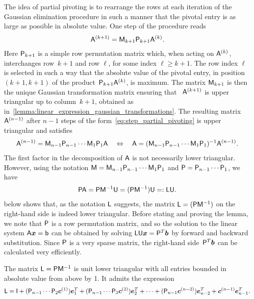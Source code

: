 The idea of partial pivoting is to rearrange the rows at each iteration of the Gaussian elimination procedure in such a manner that
the pivotal entry is as large as possible in absolute value.
One step of the procedure reads
\begin{equation}
    \label{eq:step_partial_pivoting}
    \mathsf A^{(k+1)} = \mathsf M_{k+1} \mathsf P_{k+1} \mathsf A^{(k)}.
\end{equation}
Here $\mathsf P_{k+1}$ is a simple row permutation matrix which,
when acting on $\mathsf A^{(k)}$,
interchanges row~$k+1$ and row $\ell$,
for some index $\ell \geq k+1$.
The row index $\ell$ is selected in such a way that the absolute value of the pivotal entry,
in position $(k+1, k+1)$ of the product~$\mathsf P_{k+1} \mathsf A^{(k)}$, is maximum.
The matrix $\mathsf M_{k+1}$ is then the unique Gaussian transformation matrix ensuring that~%
$\mathsf A^{(k+1)}$ is upper triangular up to column~$k+1$,
obtained as in~\cref{lemma:linear_expression_gaussian_transformations}.
The resulting matrix $\mathsf A^{(n-1)}$ after $n-1$ steps of the form~\eqref{eq:step_partial_pivoting} is upper triangular and satisfies
\[
    \mathsf A^{(n-1)} = \mathsf M_{n-1} \mathsf P_{n-1} \dotsb \mathsf M_{1} \mathsf P_{1} \mathsf A
    \quad \Leftrightarrow \quad
     \mathsf A = (\mathsf M_{n-1} \mathsf P_{n-1} \dotsb \mathsf M_{1} \mathsf P_{1})^{-1} \mathsf A^{(n-1)}.
\]
The first factor in the decomposition of $\mathsf A$ is not necessarily lower triangular.
However, using the notation $\mathsf M = \mathsf M_{n-1} \mathsf P_{n-1} \dotsb \mathsf M_{1} \mathsf P_{1}$ and $\mathsf P = \mathsf P_{n-1} \dotsb \mathsf P_{1}$,
we have
\begin{equation}
    \label{eq:plu_decomposition}
    \mathsf P \mathsf A = \mathsf P \mathsf M^{-1} \mathsf U = (\mathsf P \mathsf M^{-1}) \mathsf U =: \mathsf L \mathsf U.
\end{equation}
 below shows that,
as the notation $\mathsf L$ suggests,
the matrix $\mathsf L = (\mathsf P \mathsf M^{-1})$ on the right-hand side is indeed lower triangular.
Before stating and proving the lemma,
we note that $\mathsf P$ is a row permutation matrix,
and so the solution to the linear system $\mathsf A \mathbf{\boldsymbol{x}} = \mathsf b$ can be obtained by solving $\mathsf L \mathsf U \mathbf{\boldsymbol{x}} = \mathsf P^T \mathbf{\boldsymbol{b}}$
by forward and backward substitution.
Since $\mathsf P$ is a very sparse matrix,
the right-hand side~$\mathsf P^T \mathbf{\boldsymbol{b}}$ can be calculated very efficiently.
\begin{lemma}
    \label{lemma:linear_matrix_l_pivoting}
    The matrix $\mathsf L = \mathsf P \mathsf M^{-1}$ is unit lower triangular
    with all entries bounded in absolute value from above by 1.
    It admits the expression
    \[
        \mathsf L
        = \mathsf I
        + (\mathsf P_{n-1} \dotsb \mathsf P_{2} \mathbf{\boldsymbol{c}}^{(1)}) \mathbf{\boldsymbol{e}}_{1}^T
        + (\mathsf P_{n-1} \dotsb \mathsf P_{3} \mathbf{\boldsymbol{c}}^{(2)}) \mathbf{\boldsymbol{e}}_{2}^T
        + \dotsb
        + (\mathsf P_{n-1} \mathbf{\boldsymbol{c}}^{(n-2)}) \mathbf{\boldsymbol{e}}_{n-2}^T
        + \mathbf{\boldsymbol{c}}^{(n-1)} \mathbf{\boldsymbol{e}}_{n-1}^T.
    \]
\end{lemma}
